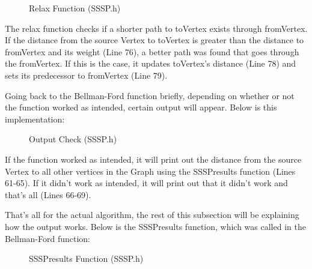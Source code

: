 \documentclass[letterpaper, 10pt]{article}
\begin{document}
\begin{figure}[H]
  \centering
   
  \caption{Relax Function (SSSP.h)}
  \label{fig:figure2.11}
\end{figure}

\noindent
The relax function checks if a shorter path to toVertex exists through fromVertex. If the distance from the source Vertex to toVertex is greater than the distance to fromVertex and its weight (Line 76), a better path was found that goes through the fromVertex. If this is the case, it updates toVertex's distance (Line 78) and sets its predecessor to fromVertex (Line 79).

\vspace{1em}
\noindent
Going back to the Bellman-Ford function briefly, depending on whether or not the function worked as intended, certain output will appear. Below is this implementation:

\begin{figure}[H]
  \centering
   
  \caption{Output Check (SSSP.h)}
  \label{fig:figure2.12}
\end{figure}

\noindent
If the function worked as intended, it will print out the distance from the source Vertex to all other vertices in the Graph using the SSSPresults function (Lines 61-65). If it didn't work as intended, it will print out that it didn't work and that's all (Lines 66-69).

\vspace{1em}
\noindent
That's all for the actual algorithm, the rest of this subsection will be explaining how the output works. Below is the SSSPresults function, which was called in the Bellman-Ford function:

\begin{figure}[H]
  \centering
   
  \caption{SSSPresults Function (SSSP.h)}
  \label{fig:figure2.13}
\end{figure}
\end{document}
